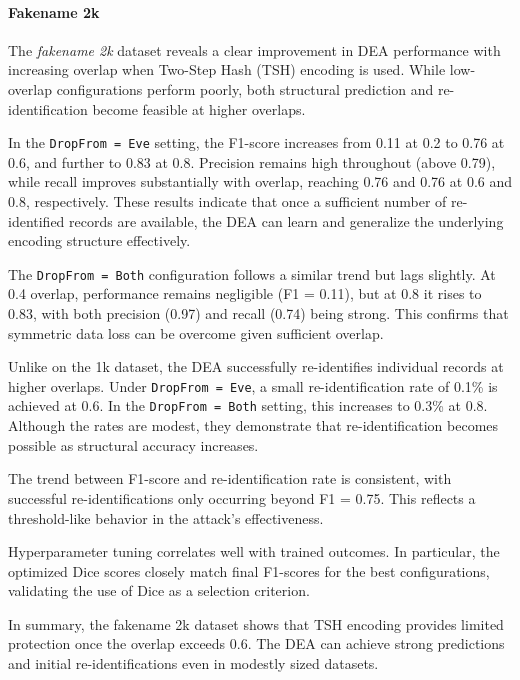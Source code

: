 \paragraph{Fakename 2k}

The \textit{fakename 2k} dataset reveals a clear improvement in DEA performance with increasing overlap when Two-Step Hash (TSH) encoding is used. While low-overlap configurations perform poorly, both structural prediction and re-identification become feasible at higher overlaps.

In the \texttt{DropFrom = Eve} setting, the F1-score increases from 0.11 at 0.2 to 0.76 at 0.6, and further to 0.83 at 0.8. Precision remains high throughout (above 0.79), while recall improves substantially with overlap, reaching 0.76 and 0.76 at 0.6 and 0.8, respectively. These results indicate that once a sufficient number of re-identified records are available, the DEA can learn and generalize the underlying encoding structure effectively.

The \texttt{DropFrom = Both} configuration follows a similar trend but lags slightly. At 0.4 overlap, performance remains negligible (F1 = 0.11), but at 0.8 it rises to 0.83, with both precision (0.97) and recall (0.74) being strong. This confirms that symmetric data loss can be overcome given sufficient overlap.

Unlike on the 1k dataset, the DEA successfully re-identifies individual records at higher overlaps. Under \texttt{DropFrom = Eve}, a small re-identification rate of 0.1\% is achieved at 0.6. In the \texttt{DropFrom = Both} setting, this increases to 0.3\% at 0.8. Although the rates are modest, they demonstrate that re-identification becomes possible as structural accuracy increases.

The trend between F1-score and re-identification rate is consistent, with successful re-identifications only occurring beyond F1 = 0.75. This reflects a threshold-like behavior in the attack's effectiveness.

Hyperparameter tuning correlates well with trained outcomes. In particular, the optimized Dice scores closely match final F1-scores for the best configurations, validating the use of Dice as a selection criterion.

In summary, the fakename 2k dataset shows that TSH encoding provides limited protection once the overlap exceeds 0.6. The DEA can achieve strong predictions and initial re-identifications even in modestly sized datasets.



